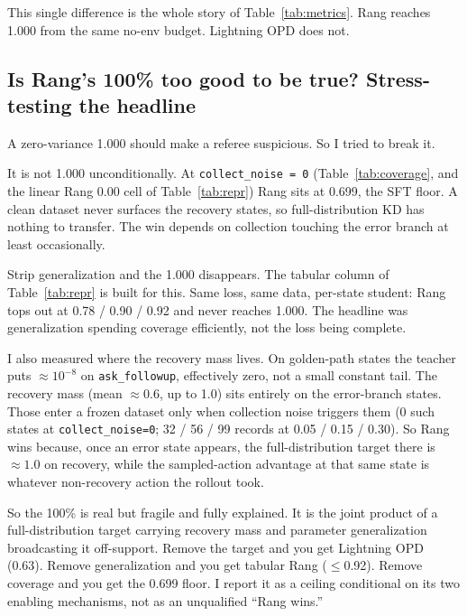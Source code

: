 \documentclass[11pt]{article}
\newcommand{\code}[1]{\texttt{#1}}
\begin{document}
This single difference is the whole story of Table~\ref{tab:metrics}. Rang reaches
1.000 from the same no-env budget. Lightning OPD does not.

\subsection{Is Rang's 100\% too good to be true? Stress-testing the headline}
\label{sec:rang-stress}

A zero-variance 1.000 should make a referee suspicious. So I tried to break it.

It is not 1.000 unconditionally. At \code{collect\_noise = 0}
(Table~\ref{tab:coverage}, and the linear Rang 0.00 cell of
Table~\ref{tab:repr}) Rang sits at 0.699, the SFT floor. A clean dataset never
surfaces the recovery states, so full-distribution KD has nothing to transfer. The
win depends on collection touching the error branch at least occasionally.

Strip generalization and the 1.000 disappears. The tabular column of
Table~\ref{tab:repr} is built for this. Same loss, same data, per-state student:
Rang tops out at 0.78 / 0.90 / 0.92 and never reaches 1.000. The headline was
generalization spending coverage efficiently, not the loss being complete.

I also measured where the recovery mass lives. On
golden-path states the teacher puts $\approx 10^{-8}$ on \code{ask\_followup},
effectively zero, not a small constant tail. The recovery mass (mean $\approx
0.6$, up to 1.0) sits entirely on the error-branch states. Those enter a frozen
dataset only when collection noise triggers them (0 such states at
\code{collect\_noise=0}; 32 / 56 / 99 records at 0.05 / 0.15 / 0.30). So Rang
wins because, once an error state appears, the full-distribution target there is
$\approx 1.0$ on recovery, while the sampled-action advantage at that same state
is whatever non-recovery action the rollout took.

So the 100\% is real but fragile and fully explained. It is the joint product of a
full-distribution target carrying recovery mass and parameter generalization
broadcasting it off-support. Remove the target and you get Lightning OPD (0.63).
Remove generalization and you get tabular Rang ($\le$0.92). Remove coverage and you
get the 0.699 floor. I report it as a ceiling conditional on its two enabling
mechanisms, not as an unqualified ``Rang wins.''

\end{document}
